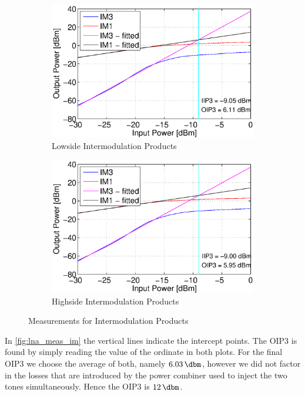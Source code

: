 \documentclass[a4paper]{article}        %
\begin{document}
  \begin{figure}[H]
    \centering
    \begin{subfigure}{0.5\textwidth}
      \centering
      \includegraphics[width=\textwidth]{fig/LNA/im_low_lna.eps}
      \caption{Lowside Intermodulation Products}
      \label{fig:lna_meas_im_low}
    \end{subfigure}%
    \begin{subfigure}{0.5\textwidth}
      \centering
      \includegraphics[width=\textwidth]{fig/LNA/im_high.eps}
      \caption{Highside Intermodulation Products}
      \label{fig:lna_meas_im_high}
    \end{subfigure}
    \caption{Measurements for Intermodulation Products}
    \label{fig:lna_meas_im}
  \end{figure}

  In \autoref{fig:lna_meas_im} the vertical lines indicate the intercept points. The OIP3 is found by simply reading the value of the ordinate in both plots. For the final OIP3 we choose the average of both, namely $\SI{6.03}{\dbm}$, however we did not factor in the losses that are introduced by the power combiner used to inject the two tones simultaneously. Hence the OIP3 is $\SI{12}{\dbm}$.
\end{document}
